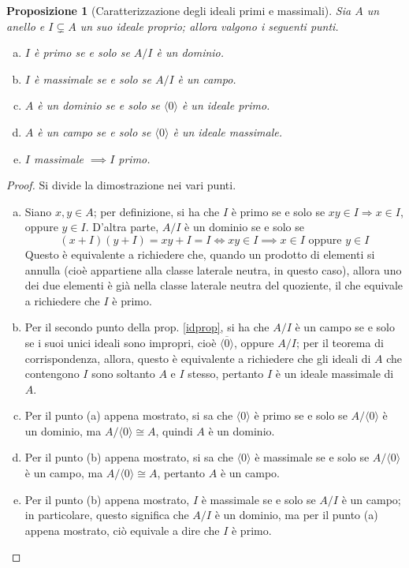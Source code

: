 \documentclass[12pt]{scrartcl}
\theoremstyle{style}
\newtheorem{prop}{Proposizione}[section]
\numberwithin{equation}{subsection}
\begin{document}
\begin{prop}
	[Caratterizzazione degli ideali primi e massimali]
\label{idprmaxchar}
	Sia $A$ un anello e $I\subsetneq A$ un suo ideale proprio; allora valgono i seguenti punti.
	\begin{enumerate}[(a).]
		\item $I$ \`e primo se e solo se $A / I$ \`e un dominio.
		\item $I$ \`e massimale se e solo se $A / I$ \`e un campo.
		\item $A$ \`e un dominio se e solo se $\langle 0 \rangle$ \`e un ideale primo.
		\item $A$ \`e un campo se e solo se $\langle 0 \rangle$ \`e un ideale massimale.
		\item $I$ massimale $\implies I$ primo.
	\end{enumerate}
\end{prop}
	\begin{proof}
		Si divide la dimostrazione nei vari punti.
		\begin{enumerate}[(a).]
			\item Siano $x,y \in A$; per definizione, si ha che $I$ \`e primo se e solo se $xy \in I\Rightarrow x \in I$, oppure $y \in I$.
				D'altra parte, $A / I $ \`e un dominio se e solo se 
				\[
					(x+I)(y+I) = xy + I = I \iff xy \in I \implies x \in I \text{ oppure }y\in I
				\] 
				Questo \`e equivalente a richiedere che, quando un prodotto di elementi si annulla (cio\`e appartiene alla classe laterale neutra, in questo caso), allora uno dei due elementi \`e gi\`a nella classe laterale neutra del quoziente, il che equivale a richiedere che $I$ \`e primo.
			\item Per il secondo punto della prop. \ref{idprop}, si ha che $A / I $ \`e un campo se e solo se i suoi unici ideali sono impropri, cio\`e $\overline{\langle 0 \rangle}$, oppure $A / I$; per il teorema di corrispondenza, allora, questo \`e equivalente a richiedere che gli ideali di $A$ che contengono $I$ sono soltanto $A$ e $I$ stesso, pertanto $I$ \`e un ideale massimale di $A$.
			\item Per il punto (a) appena mostrato, si sa che $\langle 0 \rangle$ \`e primo se e solo se $A / \langle 0 \rangle$ \`e un dominio, ma $A / \langle 0 \rangle\cong A$, quindi $A$ \`e un dominio.
			\item Per il punto (b) appena mostrato, si sa che $\langle 0 \rangle$ \`e massimale se e solo se $A / \langle 0 \rangle$ \`e un campo, ma $A / \langle 0 \rangle\cong A$, pertanto $A$ \`e un campo.
			\item Per il punto (b) appena mostrato, $I$ \`e massimale se e solo se $A / I$ \`e un campo; in particolare, questo significa che $A / I$ \`e un dominio, ma per il punto (a) appena mostrato, ci\`o equivale a dire che $I$ \`e primo.
		\end{enumerate}
	\end{proof}
\end{document}
